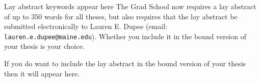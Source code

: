 {}

\begin{abstract}
The abstract for you thesis will appear on this page.  It should be limited to 350 words for a Ph.D thesis or 500 words for a Master's thesis.
\end{abstract}

\begin{layabstract}{Lay abstract keywords appear here}
The Grad School now requires a lay abstract of up to 350 words for all theses, but also requires that the lay abstract be submitted electronically to Lauren E. Dupee (email: \verb=lauren.e.dupee@maine.edu=).  Whether you include it in the bound version of your thesis is your choice.

If you do want to include the lay abstract in the bound version of your thesis then it will appear here.
\end{layabstract}

